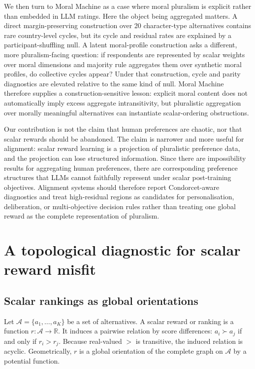 \documentclass[10pt]{article}
\theoremstyle{definition}
\theoremstyle{remark}
\begin{document}
We then turn to Moral Machine\cite{awad2018} as a case where moral pluralism is explicit rather than embedded in LLM ratings. Here the object being aggregated matters. A direct margin-preserving construction over 20 character-type alternatives contains rare country-level cycles, but its cycle and residual rates are explained by a participant-shuffling null. A latent moral-profile construction asks a different, more pluralism-facing question: if respondents are represented by scalar weights over moral dimensions and majority rule aggregates them over synthetic moral profiles, do collective cycles appear? Under that construction, cycle and parity diagnostics are elevated relative to the same kind of null. Moral Machine therefore supplies a construction-sensitive lesson: explicit moral content does not automatically imply excess aggregate intransitivity, but pluralistic aggregation over morally meaningful alternatives can instantiate scalar-ordering obstructions.

Our contribution is not the claim that human preferences are chaotic, nor that scalar rewards should be abandoned. The claim is narrower and more useful for alignment: scalar reward learning is a projection of pluralistic preference data, and the projection can lose structured information. Since there are impossibility results for aggregating human preferences, there are corresponding preference structures that LLMs cannot faithfully represent under scalar post-training objectives. Alignment systems should therefore report Condorcet-aware diagnostics and treat high-residual regions as candidates for personalisation, deliberation, or multi-objective decision rules rather than treating one global reward as the complete representation of pluralism.

\section{A topological diagnostic for scalar reward misfit}
\label{sec:framework}

\subsection{Scalar rankings as global orientations}

Let $\mathcal{A} = \{a_1, \ldots, a_K\}$ be a set of alternatives. A scalar reward or ranking is a function $r : \mathcal{A} \to \mathbb{R}$. It induces a pairwise relation by score differences: $a_i \succ a_j$ if and only if $r_i > r_j$. Because real-valued $>$ is transitive, the induced relation is acyclic. Geometrically, $r$ is a global orientation of the complete graph on $\mathcal{A}$ by a potential function.
\end{document}
